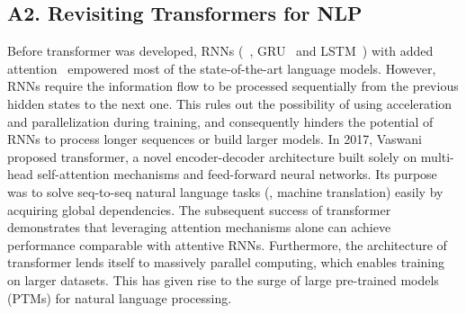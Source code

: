 \subsection*{A2. Revisiting Transformers for NLP}\label{Sec:Introduction}
Before transformer was developed, RNNs (~\eg, GRU~ and LSTM~) with added attention~ empowered most of the state-of-the-art language models. However, RNNs require the information flow to be processed sequentially from the previous hidden states to the next one. This rules out the possibility of using acceleration and parallelization during training, and consequently hinders the potential of RNNs to process longer sequences or build larger models. In 2017, Vaswani~\etal~ proposed transformer, a novel encoder-decoder architecture built solely on multi-head self-attention mechanisms and feed-forward neural networks. Its purpose was to solve seq-to-seq natural language tasks (\eg, machine translation) easily by acquiring global dependencies. The subsequent success of transformer demonstrates that leveraging attention mechanisms alone can achieve performance comparable with attentive RNNs. Furthermore, the architecture of transformer lends itself to massively parallel computing, which enables training on larger datasets. This has given rise to the surge of large pre-trained models (PTMs) for natural language processing.
